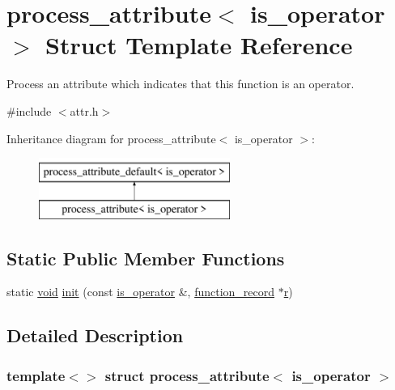 \hypertarget{structprocess__attribute_3_01is__operator_01_4}{}\section{process\+\_\+attribute$<$ is\+\_\+operator $>$ Struct Template Reference}
\label{structprocess__attribute_3_01is__operator_01_4}


Process an attribute which indicates that this function is an operator.  




{\ttfamily \#include $<$attr.\+h$>$}

Inheritance diagram for process\+\_\+attribute$<$ is\+\_\+operator $>$\+:\begin{figure}[H]
\begin{center}
\leavevmode
\includegraphics[height=2.000000cm]{structprocess__attribute_3_01is__operator_01_4}
\end{center}
\end{figure}
\subsection*{Static Public Member Functions}
\begin{DoxyCompactItemize}
\item 
static \mbox{\hyperlink{_s_d_l__opengles2__gl2ext_8h_ae5d8fa23ad07c48bb609509eae494c95}{void}} \mbox{\hyperlink{structprocess__attribute_3_01is__operator_01_4_a4059c8aba2371dd6b8d05c49bc1624f5}{init}} (const \mbox{\hyperlink{structis__operator}{is\+\_\+operator}} \&, \mbox{\hyperlink{structfunction__record}{function\+\_\+record}} $\ast$\mbox{\hyperlink{_s_d_l__opengl_8h_a42ce7cdc612e53abee15043f80220d97}{r}})
\end{DoxyCompactItemize}


\subsection{Detailed Description}
\subsubsection*{template$<$$>$\newline
struct process\+\_\+attribute$<$ is\+\_\+operator $>$}

